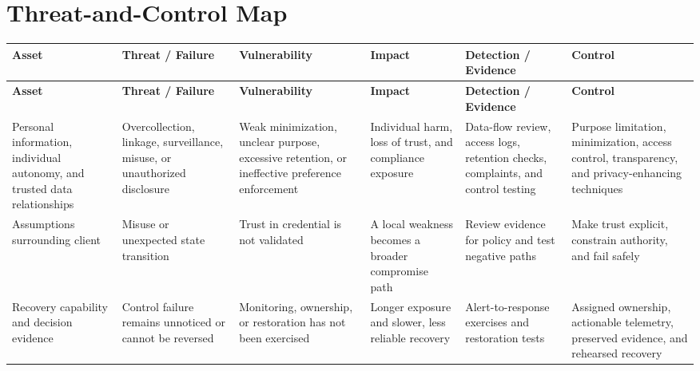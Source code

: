\documentclass[11pt,letterpaper]{article}
\begin{document}
\section*{Threat-and-Control Map}
\begingroup\scriptsize\setlength{\tabcolsep}{2pt}
\begin{longtable}{>{\raggedright\arraybackslash}p{}>{\raggedright\arraybackslash}p{}>{\raggedright\arraybackslash}p{}>{\raggedright\arraybackslash}p{}>{\raggedright\arraybackslash}p{}>{\raggedright\arraybackslash}p{}}
\toprule\rowcolor{Navy}\color{white}\textbf{Asset} & \color{white}\textbf{Threat / Failure} & \color{white}\textbf{Vulnerability} & \color{white}\textbf{Impact} & \color{white}\textbf{Detection / Evidence} & \color{white}\textbf{Control}\\\midrule
\endfirsthead
\toprule\rowcolor{Navy}\color{white}\textbf{Asset} & \color{white}\textbf{Threat / Failure} & \color{white}\textbf{Vulnerability} & \color{white}\textbf{Impact} & \color{white}\textbf{Detection / Evidence} & \color{white}\textbf{Control}\\\midrule
\endhead
Personal information, individual autonomy, and trusted data relationships & Overcollection, linkage, surveillance, misuse, or unauthorized disclosure & Weak minimization, unclear purpose, excessive retention, or ineffective preference enforcement & Individual harm, loss of trust, and compliance exposure & Data-flow review, access logs, retention checks, complaints, and control testing & Purpose limitation, minimization, access control, transparency, and privacy-enhancing techniques\\\midrule
Assumptions surrounding client & Misuse or unexpected state transition & Trust in credential is not validated & A local weakness becomes a broader compromise path & Review evidence for policy and test negative paths & Make trust explicit, constrain authority, and fail safely\\\midrule
Recovery capability and decision evidence & Control failure remains unnoticed or cannot be reversed & Monitoring, ownership, or restoration has not been exercised & Longer exposure and slower, less reliable recovery & Alert-to-response exercises and restoration tests & Assigned ownership, actionable telemetry, preserved evidence, and rehearsed recovery\\\midrule
\bottomrule
\end{longtable}
\endgroup
\end{document}
